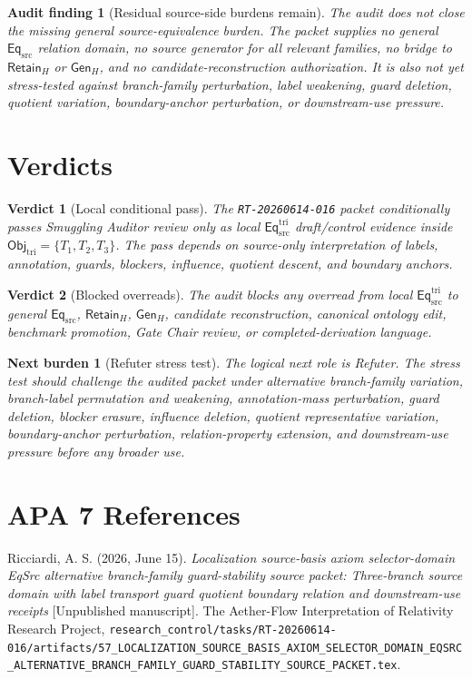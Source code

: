 \documentclass[11pt]{article}
\newcommand{\EqSrc}{\mathsf{Eq}_{\mathrm{src}}}
\newcommand{\EqTri}{\mathsf{Eq}_{\mathrm{src}}^{\mathrm{tri}}}
\newcommand{\ObjTri}{\mathsf{Obj}_{\mathrm{tri}}}
\newcommand{\RetainH}{\mathsf{Retain}_{H}}
\newcommand{\GenH}{\mathsf{Gen}_{H}}
\newtheorem{auditfinding}{Audit finding}
\newtheorem{verdict}{Verdict}
\newtheorem{nextburden}{Next burden}
\begin{document}
\begin{auditfinding}[Residual source-side burdens remain]
The audit does not close the missing general source-equivalence burden.
The packet supplies no general \(\EqSrc\) relation domain, no source
generator for all relevant families, no bridge to \(\RetainH\) or
\(\GenH\), and no candidate-reconstruction authorization. It is also
not yet stress-tested against branch-family perturbation, label
weakening, guard deletion, quotient variation, boundary-anchor
perturbation, or downstream-use pressure.
\end{auditfinding}

\section{Verdicts}

\begin{verdict}[Local conditional pass]
The \texttt{RT-20260614-016} packet conditionally passes Smuggling
Auditor review only as local \(\EqTri\) draft/control evidence inside
\(\ObjTri=\{T_{1},T_{2},T_{3}\}\). The pass depends on source-only
interpretation of labels, annotation, guards, blockers, influence,
quotient descent, and boundary anchors.
\end{verdict}

\begin{verdict}[Blocked overreads]
The audit blocks any overread from local \(\EqTri\) to general
\(\EqSrc\), \(\RetainH\), \(\GenH\), candidate reconstruction,
canonical ontology edit, benchmark promotion, Gate Chair review, or
completed-derivation language.
\end{verdict}

\begin{nextburden}[Refuter stress test]
The logical next role is Refuter. The stress test should challenge the
audited packet under alternative branch-family variation, branch-label
permutation and weakening, annotation-mass perturbation, guard deletion,
blocker erasure, influence deletion, quotient representative variation,
boundary-anchor perturbation, relation-property extension, and
downstream-use pressure before any broader use.
\end{nextburden}

\section*{APA 7 References}

Ricciardi, A. S. (2026, June 15). \emph{Localization source-basis axiom
selector-domain EqSrc alternative branch-family guard-stability source
packet: Three-branch source domain with label transport guard quotient
boundary relation and downstream-use receipts} [Unpublished manuscript].
The Aether-Flow Interpretation of Relativity Research Project,
\texttt{research\_control/tasks/RT-20260614-016/artifacts/57\_LOCALIZATION\_SOURCE\_BASIS\_AXIOM\_SELECTOR\_DOMAIN\_EQSRC\_ALTERNATIVE\_BRANCH\_FAMILY\_GUARD\_STABILITY\_SOURCE\_PACKET.tex}.
\end{document}
